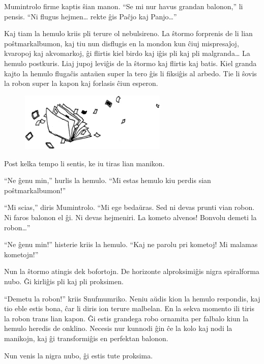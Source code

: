 Mumintrolo firme kaptis ŝian manon. ``Se mi nur havus grandan balonon,'' li pensis. ``Ni flugus hejmen{\ldots} rekte ĝis Paĉjo kaj Panjo{\ldots}''

Kaj tiam la hemulo kriis pli terure ol nebulsireno. La ŝtormo forprenis de li lian poŝtmarkalbumon, kaj tiu nun disflugis en la mondon kun ĉiuj mispresaĵoj, kvaropoj kaj akvomarkoj, ĝi flirtis kiel birdo kaj iĝis pli kaj pli malgranda{\ldots} La hemulo postkuris. Liaj jupoj leviĝis de la ŝtormo kaj flirtis kaj batis. Kiel granda kajto la hemulo flugaĉis antaŭen super la tero ĝis li fiksiĝis al arbedo. Tie li ŝovis la robon super la kapon kaj forlasis ĉiun esperon.

\begin{figure}[htbp]
\centering
\includegraphics[width=200pt,height=79pt]{8-7.png}
\caption{}
\label{8-7}
\end{figure}

Post kelka tempo li sentis, ke iu tiras lian manikon.

``Ne ĝenu min,'' hurlis la hemulo. ``Mi estas hemulo kiu perdis sian poŝtmarkalbumon!''

``Mi scias,'' diris Mumintrolo. ``Mi ege bedaŭras. Sed ni devas prunti vian robon. Ni faros balonon el ĝi. Ni devas hejmeniri. La kometo alvenos! Bonvolu demeti la robon{\ldots}''

``Ne ĝenu min!'' histerie kriis la hemulo. ``Kaj ne parolu pri kometoj! Mi malamas kometojn!''

Nun la ŝtormo atingis dek bofortojn. De horizonte alproksimiĝis nigra spiralforma nubo. Ĝi kirliĝis pli kaj pli proksimen.

``Demetu la robon!'' kriis Snufmumriko. Neniu aŭdis kion la hemulo respondis, kaj tio eble estis bona, ĉar li diris ion terure malbelan. En la sekva momento ili tiris la robon trans lian kapon. Ĝi estis grandega robo ornamita per falbalo kiun la hemulo heredis de onklino. Necesis nur kunnodi ĝin ĉe la kolo kaj nodi la manikojn, kaj ĝi transformiĝis en perfektan balonon.

Nun venis la nigra nubo, ĝi estis tute proksima.

